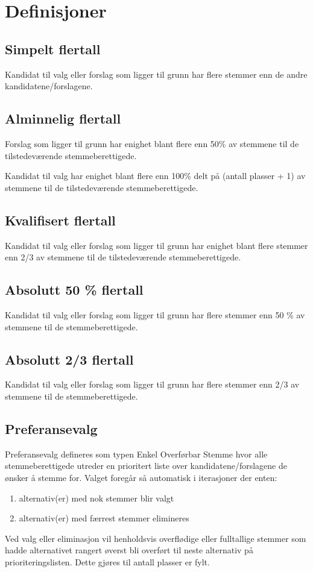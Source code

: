 \section{Definisjoner}
\subsection{Simpelt flertall}
Kandidat til valg eller forslag som ligger til grunn har flere stemmer enn de
andre kandidatene/forslagene.

\subsection{Alminnelig flertall}
Forslag som ligger til grunn har enighet blant flere enn 50\% av stemmene til de
tilstedeværende stemmeberettigede.

Kandidat til valg har enighet blant flere enn 100\% delt på (antall plasser + 1)
av stemmene til de tilstedeværende stemmeberettigede.

\subsection{Kvalifisert flertall}
Kandidat til valg eller forslag som ligger til grunn har enighet blant flere
stemmer enn 2/3 av stemmene til de tilstedeværende stemmeberettigede.

\subsection{Absolutt 50 \% flertall}
Kandidat til valg eller forslag som ligger til grunn har flere stemmer enn 50 \%
av stemmene til de stemmeberettigede.

\subsection{Absolutt 2/3 flertall}
Kandidat til valg eller forslag som ligger til grunn har flere stemmer enn 2/3
av stemmene til de stemmeberettigede.

\subsection{Preferansevalg}
Preferansevalg defineres som typen Enkel Overførbar Stemme hvor alle
stemmeberettigede utreder en prioritert liste over
kandidatene/forslagene de ønsker å stemme for.
Valget foregår så automatisk i iterasjoner der enten:
\begin{enumerate}
  \item alternativ(er) med nok stemmer blir valgt
  \item alternativ(er) med færrest stemmer elimineres
\end{enumerate}
Ved valg eller eliminasjon vil henholdsvis overflødige eller fulltallige stemmer
som hadde alternativet rangert øverst bli overført til neste alternativ på
prioriteringslisten. Dette gjøres til antall plasser er fylt.
